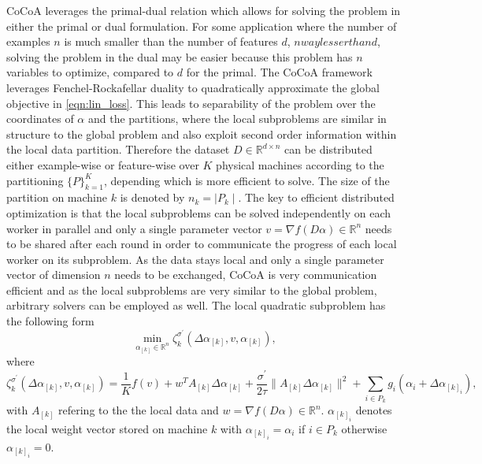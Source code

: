 CoCoA leverages the primal-dual relation which allows for solving the problem in either the primal or dual formulation.
For some application where the number of examples $n$ is much smaller than the number of features $d$, $n way lesser than d$, solving the problem in the dual may be easier because this problem has $n$ variables to optimize, compared to $d$ for the primal.
The CoCoA framework leverages Fenchel-Rockafellar duality to quadratically approximate the global objective in \ref{eqn:lin_loss}.
This leads to separability of the problem over the coordinates of $\alpha$ and the partitions, where the local subproblems are similar in structure to the global problem and also exploit second order information within the local data partition.
Therefore the dataset $D \in \mathbb{R}^{d \times n}$ can be distributed either example-wise or feature-wise over $K$ physical machines according to the partitioning $\{P\}_{k=1}^K$, depending which is more efficient to solve.
The size of the partition on machine $k$ is denoted by $n_k = \mid P_k \mid$.
The key to efficient distributed optimization is that the local subproblems can be solved independently on each worker in parallel and only a single parameter vector $v = \nabla f(D\alpha) \in \mathbb{R}^n$ needs to be shared after each round in order to communicate the progress of each local worker on its subproblem.
As the data stays local and only a single parameter vector of dimension $n$ needs to be exchanged, CoCoA is very communication efficient and as the local subproblems are very similar to the global problem, arbitrary solvers can be employed as well.
The local quadratic subproblem has the following form
\begin{equation}
\min_{\alpha_{[k]} \in \mathbb{R}^n} \zeta_k^{\sigma^\prime}(\Delta\alpha_{[k]}, v, \alpha_{[k]}),
\label{eqn:min_local_subp}
\end{equation}
where
\begin{equation}
\zeta_k^{\sigma^\prime}(\Delta\alpha_{[k]}, v, \alpha_{[k]}) = \frac{1}{K}f(v) + w^TA_{[k]}\Delta\alpha_{[k]} + \frac{\sigma^\prime}{2\tau}\|A_{[k]}\Delta\alpha_{[k]}\|^2 + \sum_{i \in P_k}g_i(\alpha_i + \Delta\alpha_{[k]_i}),
\label{eqn:local_subp}
\end{equation}
with $A_{[k]}$ refering to the the local data and $w = \nabla f(D\alpha) \in \mathbb{R}^n$.
$\alpha_{[k]_i}$ denotes the local weight vector stored on machine $k$ with $\alpha_{[k]_i} = \alpha_i$ if $i \in P_k$ otherwise $\alpha_{[k]_i} = 0$.
